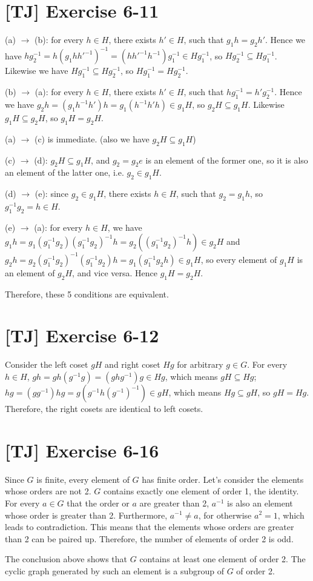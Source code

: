 \documentclass[a4paper,11pt,twocolumn]{article}
\begin{document}
  \section{[TJ] Exercise 6-11}
  (a) $\rightarrow$ (b): for every $h \in H$, there exists $h' \in H$, such that $g_1h = g_2h'$. Hence we have $hg_2^{-1} = h(g_1hh'^{-1})^{-1} = (hh'^{-1}h^{-1})g_1^{-1} \in Hg_1^{-1}$, so $Hg_2^{-1} \subseteq Hg_1^{-1}$. Likewise we have $Hg_1^{-1} \subseteq Hg_2^{-1}$, so $Hg_1^{-1} = Hg_2^{-1}$. \par
  (b) $\rightarrow$ (a): for every $h \in H$, there exists $h' \in H$, such that $hg_1^{-1} = h'g_2^{-1}$. Hence we have $g_2h = (g_1h^{-1}h')h = g_1(h^{-1}h'h) \in g_1H $, so $g_2H \subseteq g_1H$. Likewise $g_1H \subseteq g_2H$, so $g_1H = g_2H$. \par
  (a) $\rightarrow$ (c) is immediate. (also we have $g_2H \subseteq g_1H$) \par
  (c) $\rightarrow$ (d): $g_2H \subseteq g_1H$, and $g_2 = g_2e$ is an element of the former one, so it is also an element of the latter one, i.e. $g_2 \in g_1H$. \par
  (d) $\rightarrow$ (e): since $g_2 \in g_1 H$, there exists $h \in H$, such that $g_2 = g_1h$, so $g_1^{-1}g_2 = h \in H$. \par
  (e) $\rightarrow$ (a): for every $h \in H$, we have
  $ g_1h = g_1(g_1^{-1}g_2)(g_1^{-1}g_2)^{-1}h = g_2((g _1^{-1}g_2)^{-1}h) \in g_2H$ and $g_2h = g_2(g_1^{-1}g_2)^{-1}(g_1^{-1}g_2)h = g_1(g_1^{-1}g_2h) \in g_1 H$, so every element of $g_1 H$ is an element of $g_2H$, and vice versa. Hence $g_1H = g_2H$. \par
  Therefore, these 5 conditions are equivalent.

  \section{[TJ] Exercise 6-12}
  Consider the left coset $gH$ and right coset $Hg$ for arbitrary $g \in G$. For every $h \in H$, $gh = gh(g^{-1}g) = (ghg^{-1})g \in Hg$, which means $gH \subseteq Hg$; $hg = (gg^{-1})hg = g(g^{-1}h(g^{-1})^{-1}) \in gH$, which means $Hg \subseteq gH$, so $gH = Hg$. Therefore, the right cosets are identical to left cosets.

  \section{[TJ] Exercise 6-16}
  Since $G$ is finite, every element of $G$ has finite order. Let's consider the elements whose orders are not 2. $G$ contains exactly one element of order 1, the identity. For every $a \in G$ that the order or $a$ are greater than 2, $a^{-1}$ is also an element whose order is greater than 2. Furthermore, $a^{-1} \neq a$, for otherwise $a^2 = 1$, which leads to contradiction. This means that the elements whose orders are greater than 2 can be paired up. Therefore, the number of elements of order 2 is odd. \par
  The conclusion above shows that $G$ contains at least one element of order 2. The cyclic graph generated by such an element is a subgroup of $G$ of order 2.
\end{document}
